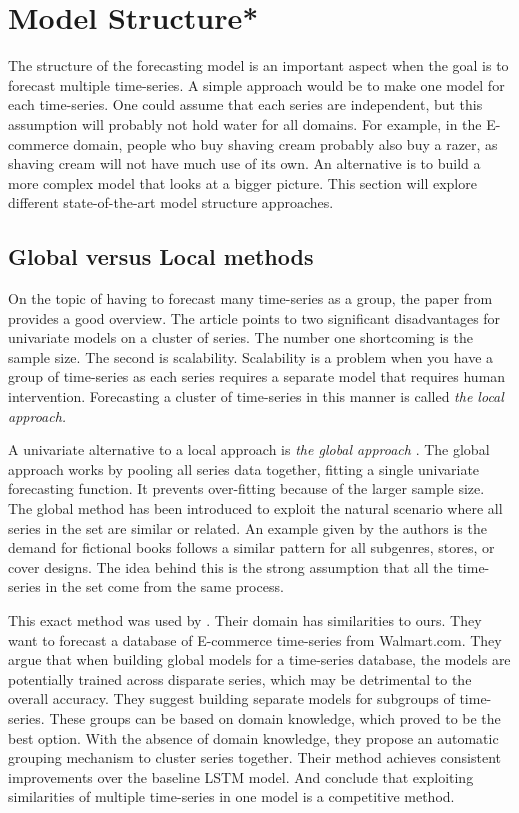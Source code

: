 \section{Model Structure*}
\label{section:RelatedWork:Model-structure}
The structure of the forecasting model is an important aspect when the goal is to forecast
multiple time-series.
A simple approach would be to make one model for each time-series.
One could assume that each series are independent, but this assumption will probably not hold water for all domains.
For example, in the E-commerce domain,
people who buy shaving cream probably also buy a razer, as shaving cream will not have much use of its own.
An alternative is to build a more complex model that looks at a bigger picture.
This section will explore different state-of-the-art model structure approaches.

\subsection{Global versus Local methods}
\label{section:RelatedWork:Model-structure:local-vs-global}
On the topic of having to forecast many time-series as a group, the paper from \cite{Montero-Manso2021} provides a good overview.
The article points to two significant disadvantages for univariate models on a cluster of series.
The number one shortcoming is the sample size. The second is scalability.
Scalability is a problem when you have a group of time-series as each series requires a separate model
that requires human intervention. Forecasting a cluster of time-series in this manner is called
\textit{the local approach.}

A univariate alternative to a local approach is \textit{the global approach}
\citep{Rabanser2020}.
The global approach works by pooling all series data together, fitting a single univariate forecasting function. It prevents over-fitting because of the larger sample size.
The global method has been introduced to exploit the natural scenario where all series
in the set are similar or related. An example given by the authors is the demand for fictional
books follows a similar pattern for all subgenres, stores, or cover designs.
The idea behind this is the strong assumption that all the time-series in the set
come from the same process.

This exact method was used by \cite{Bandara2017}.
Their domain has similarities to ours. They want to forecast a database of E-commerce time-series
from Walmart.com.
They argue that when building global models for a time-series database, the models are
potentially trained across disparate series, which may be detrimental to the overall accuracy.
They suggest building separate models for subgroups of time-series.
These groups can be based on domain knowledge, which proved to be the best option. With the absence of
domain knowledge, they propose an automatic grouping mechanism to cluster series together.
Their method achieves consistent improvements over the baseline LSTM model.
And conclude that exploiting similarities of multiple time-series in one model is a competitive method.

